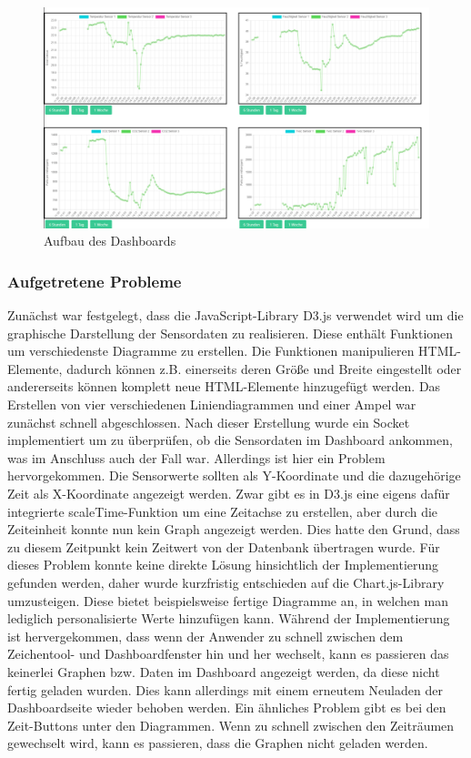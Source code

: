 \documentclass[]{article}
\begin{document}
			\begin{figure}[h]
				\centering
				\includegraphics[scale=0.40]{images/Dashboardbild}
				\caption{Aufbau des Dashboards}
				\label{img:Dashboardbild}
			\end{figure}
			
			\subsubsection{Aufgetretene Probleme}
			Zunächst war festgelegt, dass die JavaScript-Library D3.js verwendet wird um die graphische Darstellung der Sensordaten zu realisieren. Diese enthält Funktionen um verschiedenste Diagramme zu erstellen. Die Funktionen manipulieren HTML-Elemente, dadurch können z.B. einerseits deren Größe und Breite eingestellt oder andererseits können komplett neue HTML-Elemente hinzugefügt werden. Das Erstellen von vier verschiedenen Liniendiagrammen und einer Ampel war zunächst schnell abgeschlossen. Nach dieser Erstellung wurde ein Socket implementiert um zu überprüfen, ob die Sensordaten im Dashboard ankommen, was im Anschluss auch der Fall war. Allerdings ist hier ein Problem hervorgekommen.\newline
			Die Sensorwerte sollten als Y-Koordinate und die dazugehörige Zeit als X-Koordinate angezeigt werden. Zwar gibt es in D3.js eine eigens dafür integrierte scaleTime-Funktion um eine Zeitachse zu erstellen, aber durch die Zeiteinheit konnte nun kein Graph angezeigt werden. Dies hatte den Grund, dass zu diesem Zeitpunkt kein Zeitwert von der Datenbank übertragen wurde. Für dieses Problem konnte keine direkte Lösung hinsichtlich der Implementierung gefunden werden, daher wurde kurzfristig entschieden auf die Chart.js-Library umzusteigen. Diese bietet beispielsweise fertige Diagramme an, in welchen man lediglich personalisierte Werte hinzufügen kann.\newline 
			Während der Implementierung ist hervergekommen, dass wenn der Anwender zu schnell zwischen dem Zeichentool- und Dashboardfenster hin und her wechselt, kann es passieren das keinerlei Graphen bzw. Daten im Dashboard angezeigt werden, da diese nicht fertig geladen wurden. Dies kann allerdings mit einem erneutem Neuladen der Dashboardseite wieder behoben werden. Ein ähnliches Problem gibt es bei den Zeit-Buttons unter den Diagrammen. Wenn zu schnell zwischen den Zeiträumen gewechselt wird, kann es passieren, dass die Graphen nicht geladen werden.
\end{document}
